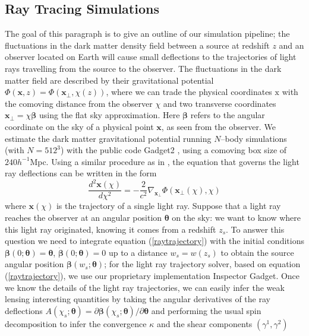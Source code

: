 \documentclass[reprint,aps,prd,superscriptaddress,showkeys,showpacs]{revtex4-1}
\begin{document}
\subsection{Ray Tracing Simulations}
\label{raysim}
The goal of this paragraph is to give an outline of our simulation pipeline; the fluctuations in the dark matter density field between a source at redshift $z$ and an observer located on Earth will cause small deflections to the trajectories of light rays travelling from the source to the observer. The fluctuations in the dark matter field are described by their gravitational potential $\Phi(\mathbf{x},z)=\Phi(\mathbf{x}_\perp,\chi(z))$, where we can trade the physical coordinates $\mathrm{x}$ with the comoving distance from the observer $\chi$ and two transverse coordinates $\mathbf{x}_\perp=\chi\pmb{\beta}$ using the flat sky approximation. Here $\pmb{\beta}$ refers to the angular coordinate on the sky of a physical point $\mathbf{x}$, as seen from the observer. We estimate the dark matter gravitational potential running $N$--body simulations (with $N=512^3$) with the public code Gadget2 \citep{Gadget2}, using a comoving box size of $240h^{-1}$Mpc. Using a similar procedure as in \citep{RayTracingJain,RayTracingHartlap}, the equation that governs the light ray deflections can be written in the form
\begin{equation}
\label{raytrajectory}
\frac{d^2\mathbf{x}(\chi)}{d\chi^2} = -\frac{2}{c^2}\nabla_{\mathbf{x}_\perp}\Phi(\mathbf{x}_\perp(\chi),\chi)
\end{equation}
%
where $\mathbf{x}(\chi)$ is the trajectory of a single light ray. Suppose that a light ray reaches the observer at an angular position $\pmb{\theta}$ on the sky: we want to know where this light ray originated, knowing it comes from a redshift $z_s$. To answer this question we need to integrate equation (\ref{raytrajectory}) with the initial conditions $\pmb{\beta}(0;\pmb{\theta})=\pmb{\theta}$, $\dot{\pmb{\beta}}(0;\pmb{\theta})=0$ up to a distance $w_s=w(z_s)$ to obtain the source angular position $\pmb{\beta}(w_s;\pmb{\theta})$; for the light ray trajectory solver, based on equation (\ref{raytrajectory}), we use our proprietary implementation Inspector Gadget. Once we know the details of the light ray trajectories, we can easily infer the weak lensing interesting quantities by taking the angular derivatives of the ray deflections $A(\chi_s;\pmb{\theta}) = \partial \pmb{\beta}(\chi_s;\pmb{\theta})/\partial\pmb{\theta}$ and performing the usual spin decomposition to infer the convergence $\kappa$ and the shear components $(\gamma^1,\gamma^2)$
\end{document}
